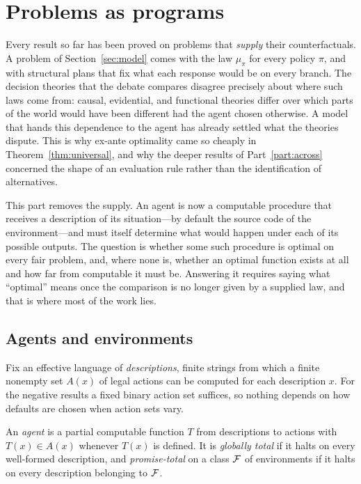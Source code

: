 \section{Problems as programs}\label{sec:programs}

Every result so far has been proved on problems that \emph{supply} their counterfactuals. A problem
of Section~\ref{sec:model} comes with the law $\mu_\pi$ for every policy $\pi$, and with structural
plans that fix what each response would be on every branch. The decision theories that the debate
compares disagree precisely about where such laws come from: causal, evidential, and functional
theories differ over which parts of the world would have been different had the agent chosen
otherwise. A model that hands this dependence to the agent has already settled what the theories
dispute. This is why ex-ante optimality came so cheaply in Theorem~\ref{thm:universal}, and why the
deeper results of Part~\ref{part:across} concerned the shape of an evaluation rule rather than the
identification of alternatives.

This part removes the supply. An agent is now a computable procedure that receives a description of
its situation---by default the source code of the environment---and must itself determine what
would happen under each of its possible outputs. The question is whether some such procedure is
optimal on every fair problem, and, where none is, whether an optimal function exists at all and how
far from computable it must be. Answering it requires saying what \enquote{optimal} means once the
comparison is no longer given by a supplied law, and that is where most of the work lies.

\subsection{Agents and environments}

Fix an effective language of \emph{descriptions}, finite strings from which a finite nonempty set
$A(x)$ of legal actions can be computed for each description $x$. For the negative results a fixed
binary action set suffices, so nothing depends on how defaults are chosen when action sets vary.

\begin{definition}[Agents]\label{def:agent}
An \emph{agent} is a partial computable function $T$ from descriptions to actions with
$T(x)\in A(x)$ whenever $T(x)$ is defined. It is \emph{globally total} if it halts on every
well-formed description, and \emph{promise-total} on a class $\mathcal{F}$ of environments if it halts on
every description belonging to $\mathcal{F}$.
\end{definition}

